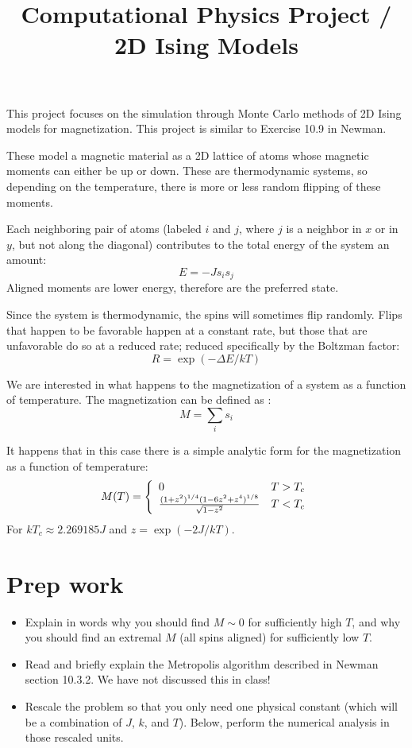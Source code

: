 \documentclass[11pt, preprint]{aastex}
\begin{document}
\title{\bf Computational Physics Project / 2D Ising Models}

This project focuses on the simulation through Monte Carlo methods of
2D Ising models for magnetization. This project is similar to Exercise
10.9 in Newman.

These model a magnetic material as a 2D lattice of atoms whose
magnetic moments can either be up or down. These are thermodynamic
systems, so depending on the temperature, there is more or less random
flipping of these moments.

Each neighboring pair of atoms (labeled $i$ and $j$, where $j$ is a
neighbor in $x$ or in $y$, but not along the diagonal) contributes to
the total energy of the system an amount:
\begin{equation}
  E = - J s_{i} s_{j}
\end{equation}
Aligned moments are lower energy, therefore are the preferred state.

Since the system is thermodynamic, the spins will sometimes flip
randomly. Flips that happen to be favorable happen at a constant rate,
but those that are unfavorable do so at a reduced rate; reduced
specifically by the Boltzman factor:
\begin{equation}
  R = \exp\left(-\Delta E /k T\right)
\end{equation}

We are interested in what happens to the magnetization of a system as
a function of temperature.  The magnetization can be defined as :
\begin{equation}
M = \sum_i s_i
\end{equation}

It happens that in this case there is a simple analytic form for the
magnetization as a function of temperature:
\begin{equation}
  M(T) = \left\{
  \begin{array}{ll}
  0 & T > T_c \cr
  \frac{(1+z^2)^{1/4} (1-6 z^2 +z^4)^{1/8}}{\sqrt{1-z^2}} & T < T_c
    \end{array}\right. 
\end{equation}
For $kT_c \approx 2.269185 J$ and $z=\exp(-2J/kT)$.

\section{Prep work}

\begin{itemize}
\item Explain in words why you should find $M\sim 0$ for sufficiently
  high $T$, and why you should find an extremal $M$ (all spins
  aligned) for sufficiently low $T$.
\item Read and briefly explain the Metropolis algorithm described in
  Newman section 10.3.2. We have not discussed this in class!
\item Rescale the problem so that you only need one physical constant
  (which will be a combination of $J$, $k$, and $T$). Below, perform
  the numerical analysis in those rescaled units.
\end{itemize}
\end{document}
